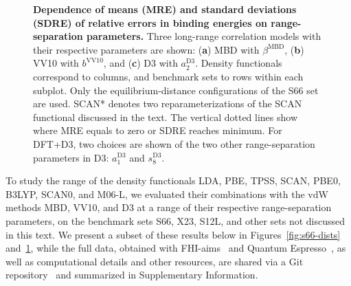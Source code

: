 \begin{figure}
{
}
\caption{\textbf{Dependence of means (MRE) and standard deviations (SDRE) of relative errors in binding energies on range-separation parameters.}
Three long-range correlation models with their respective parameters are shown: (\textbf a) MBD with $\beta^\text{MBD}$, (\textbf b) VV10 with $b^\text{VV10}$, and (\textbf c) D3 with $a_2^\text{D3}$.
Density functionals correspond to columns, and benchmark sets to rows within each subplot.
Only the equilibrium-distance configurations of the S66 set are used.
SCAN* denotes two reparameterizations of the SCAN functional discussed in the text. %
The vertical dotted lines show where MRE equals to zero or SDRE reaches minimum.
For DFT+D3, two choices are shown of the two other range-separation parameters in D3: $a_1^\text{D3}$ and $s_8^\text{D3}$.
}\label{fig:param-fitting}
\end{figure}

To study the range of the density functionals LDA, PBE, TPSS, SCAN, PBE0, B3LYP, SCAN0, and M06-L, we evaluated their combinations with the vdW methods MBD, VV10, and D3 at a range of their respective range-separation parameters, on the benchmark sets S66, X23, S12L, and other sets not discussed in this text.
We present a subset of these results below in Figures~\ref{fig:s66-dists} and~\ref{fig:param-fitting}, while the full data, obtained with FHI-aims~\cite{BlumCPC09} and Quantum Espresso~\cite{GiannozziJPCM09,HamannPRB13}, as well as computational details and other resources, are shared via a Git repository~\cite{GitRepo} and summarized in Supplementary Information.

